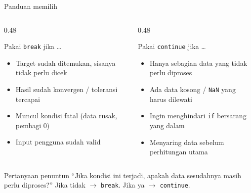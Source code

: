 \documentclass[aspectratio=169,10pt]{beamer}
\newcommand{\kode}[1]{\texttt{#1}}
\begin{document}
\begin{frame}[fragile]{Panduan memilih}
  \begin{columns}[T]
    \begin{column}{0.48\textwidth}
      \begin{block}{Pakai \kode{break} jika \ldots}
        \begin{itemize}
          \item Target sudah ditemukan, sisanya tidak perlu dicek
          \item Hasil sudah konvergen / toleransi tercapai
          \item Muncul kondisi fatal (data rusak, pembagi 0)
          \item Input pengguna sudah valid
        \end{itemize}
      \end{block}
    \end{column}
    \begin{column}{0.48\textwidth}
      \begin{block}{Pakai \kode{continue} jika \ldots}
        \begin{itemize}
          \item Hanya sebagian data yang tidak perlu diproses
          \item Ada data kosong / \kode{NaN} yang harus dilewati
          \item Ingin menghindari \kode{if} bersarang yang dalam
          \item Menyaring data sebelum perhitungan utama
        \end{itemize}
      \end{block}
    \end{column}
  \end{columns}
  \vspace{8pt}
  \begin{alertblock}{Pertanyaan penuntun}
    ``Jika kondisi ini terjadi, apakah data \alert{sesudahnya} masih perlu diproses?''
    Jika tidak $\rightarrow$ \kode{break}. Jika ya $\rightarrow$ \kode{continue}.
  \end{alertblock}
\end{frame}
\end{document}
